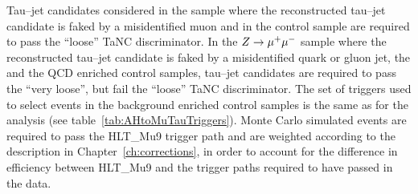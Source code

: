 Tau--jet candidates considered in the \ZMM sample where the
reconstructed tau--jet candidate is faked by a misidentified muon and in the
\ttbarpJets control sample are required to pass the ``loose'' TaNC
discriminator.  In the $Z\to\mu^+\mu^-$ sample where the reconstructed tau--jet candidate
is faked by a misidentified quark or gluon jet, the \WpJets and the QCD
enriched control samples, tau--jet candidates are required to pass the ``very
loose'', but fail the ``loose'' TaNC discriminator.  The set of triggers used to
select events in the background enriched control samples is the same as for the
analysis (see table~\ref{tab:AHtoMuTauTriggers}).  Monte Carlo simulated events
are required to pass the HLT\_Mu9 trigger path and are weighted according to the
description in Chapter~\ref{ch:corrections}, in order to account for
the difference in efficiency between HLT\_Mu9 and the trigger paths required to
have passed in the data.

